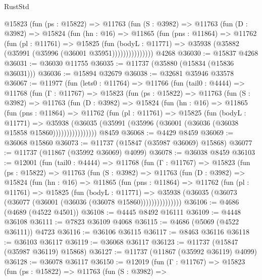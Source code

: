 \begin{lexlean}{RustStd}
\begin{coremodule}
          @15823
            (fun (ps : @15822) =>
            @11763
              (fun (S : @3982) =>
              @11763
                (fun (D : @3982) =>
                @15824
                  (fun (hn : @16) =>
                  @11865
                    (fun (pns : @11864) =>
                    @11762
                      (fun (pl : @11761) =>
                      @15825
                        (fun (bodyL : @11771) =>
                        @35938 (@35882 (@35991 (@35996 (@36001 @35951)))))))))))))))
    @4268
@36030 := @15837 @4268
@36031 := @36030 @11755
@36035 := @11737 (@35880 (@15834 (@15836 @36031)))
@36036 := @15894 @32679
@36038 := @32681 @35946 @33578
@36067 := @11977
    (fun (lets0 : @11764) =>
    @11766
      (fun (tail0 : @4444) =>
      @11768
        (fun (Γ : @11767) =>
        @15823
          (fun (ps : @15822) =>
          @11763
            (fun (S : @3982) =>
            @11763
              (fun (D : @3982) =>
              @15824
                (fun (hn : @16) =>
                @11865
                  (fun (pns : @11864) =>
                  @11762
                    (fun (pl : @11761) =>
                    @15825
                      (fun (bodyL : @11771) =>
                      @35938
                        (@36035
                          (@35991 (@35996 (@36001 (@36036 (@36038 @15858 @15860))))))))))))))))
    @8459
@36068 := @4429 @8459
@36069 := @36068 @15860
@36073 := @11737 (@15847 (@35987 @36069) @15868)
@36077 := @11737 (@11867 (@35992 @36069) @4099)
@36078 := @36038 @8459
@36103 := @12001
    (fun (tail0 : @4444) =>
    @11768
      (fun (Γ : @11767) =>
      @15823
        (fun (ps : @15822) =>
        @11763
          (fun (S : @3982) =>
          @11763
            (fun (D : @3982) =>
            @15824
              (fun (hn : @16) =>
              @11865
                (fun (pns : @11864) =>
                @11762
                  (fun (pl : @11761) =>
                  @15825
                    (fun (bodyL : @11771) =>
                    @35938 (@36035 (@36073 (@36077 (@36001 (@36036 (@36078 @15860)))))))))))))))
@36106 := @4686 (@4689 (@4522 @4501))
@36108 := @4445 @8492 @16111
@36109 := @4448 @36108
@36111 := @7823 @36109 @4068
@36115 := @4686 (@5069 (@4522 @36111)) @4723
@36116 := @36106 @36115
@36117 := @8463 @36116
@36118 := @36103 @36117
@36119 := @36068 @36117
@36123 := @11737 (@15847 (@35987 @36119) @15868)
@36127 := @11737 (@11867 (@35992 @36119) @4099)
@36128 := @36078 @36117
@36150 := @12019
    (fun (Γ : @11767) =>
    @15823
      (fun (ps : @15822) =>
      @11763
        (fun (S : @3982) =>

\end{coremodule}
\end{lexlean}

